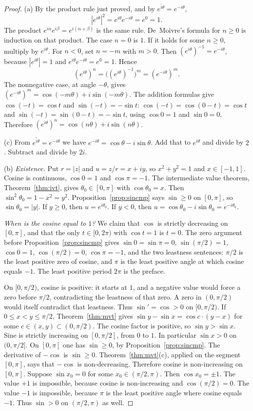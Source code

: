 \begin{proof}
(a) By the product rule just proved, and by $\overline{e^{i\theta}}=e^{-i\theta}$,
\[
|e^{i\theta}|^2=e^{i\theta}e^{-i\theta}=e^0=1.
\]
The product $e^{i\alpha}e^{i\beta}=e^{i(\alpha+\beta)}$ is the same rule. De~Moivre's formula for $n\ge0$ is induction on that product. The case $n=0$ is $1$. If it holds for some $n\ge0$, multiply by $e^{i\theta}$. For $n<0$, set $n=-m$ with $m>0$. Then $(e^{i\theta})^{-1}=e^{-i\theta}$, because $|e^{i\theta}|=1$ and $e^{i\theta}e^{-i\theta}=e^0=1$. Hence
\[
(e^{i\theta})^n=\bigl((e^{i\theta})^{-1}\bigr)^m=(e^{-i\theta})^m.
\]
The nonnegative case, at angle $-\theta$, gives $(e^{-i\theta})^m=\cos(-m\theta)+i\sin(-m\theta)$. The addition formulas give $\cos(-t)=\cos t$ and $\sin(-t)=-\sin t$: $\cos(-t)=\cos(0-t)=\cos t$ and $\sin(-t)=\sin(0-t)=-\sin t$, using $\cos 0=1$ and $\sin 0=0$. Therefore $(e^{i\theta})^n=\cos(n\theta)+i\sin(n\theta)$.

(c) From $\overline{e^{i\theta}}=e^{-i\theta}$ we have $e^{-i\theta}=\cos\theta-i\sin\theta$. Add that to $e^{i\theta}$ and divide by $2$. Subtract and divide by $2i$.

(b) \emph{Existence.} Put $r=|z|$ and $u=z/r=x+iy$, so $x^2+y^2=1$ and $x\in[-1,1]$. Cosine is continuous, $\cos0=1$ and $\cos\pi=-1$. The intermediate value theorem, Theorem~\ref{thm:ivt}, gives $\theta_0\in[0,\pi]$ with $\cos\theta_0=x$. Then $\sin^2\theta_0=1-x^2=y^2$. Proposition~\ref{prop:sincmp} says $\sin\ge0$ on $[0,\pi]$, so $\sin\theta_0=|y|$. If $y\ge0$, then $u=e^{i\theta_0}$. If $y<0$, then $u=\cos\theta_0-i\sin\theta_0=e^{-i\theta_0}$.

\emph{When is the cosine equal to $1$?} We claim that $\cos$ is strictly decreasing on $[0,\pi]$, and that the only $t\in[0,2\pi)$ with $\cos t=1$ is $t=0$. The zero argument before Proposition~\ref{prop:sincmp} gives $\sin0=\sin\pi=0$, $\sin(\pi/2)=1$, $\cos0=1$, $\cos(\pi/2)=0$, $\cos\pi=-1$, and the two leastness sentences: $\pi/2$ is the least positive zero of cosine, and $\pi$ is the least positive angle at which cosine equals $-1$. The least positive period $2\pi$ is the preface.

On $[0,\pi/2)$, cosine is positive: it starts at $1$, and a negative value would force a zero before $\pi/2$, contradicting the leastness of that zero. A zero in $(0,\pi/2)$ would itself contradict that leastness. Thus $\sin'=\cos>0$ on $[0,\pi/2)$. If $0\le x<y\le\pi/2$, Theorem~\ref{thm:mvt} gives $\sin y-\sin x=\cos c\cdot(y-x)$ for some $c\in(x,y)\subset(0,\pi/2)$. The cosine factor is positive, so $\sin y>\sin x$. Sine is strictly increasing on $[0,\pi/2]$, from $0$ to $1$. In particular $\sin x>0$ on $(0,\pi/2]$. On $[0,\pi]$ one has $\sin\ge0$, by Proposition~\ref{prop:sincmp}. The derivative of $-\cos$ is $\sin\ge0$. Theorem~\ref{thm:mvt}(c), applied on the segment $[0,\pi]$, says that $-\cos$ is non-decreasing. Therefore cosine is non-increasing on $[0,\pi]$. Suppose $\sin x_0=0$ for some $x_0\in(\pi/2,\pi)$. Then $\cos x_0=\pm1$. The value $+1$ is impossible, because cosine is non-increasing and $\cos(\pi/2)=0$. The value $-1$ is impossible, because $\pi$ is the least positive angle where cosine equals $-1$. Thus $\sin>0$ on $(\pi/2,\pi)$ as well.


\end{proof}

